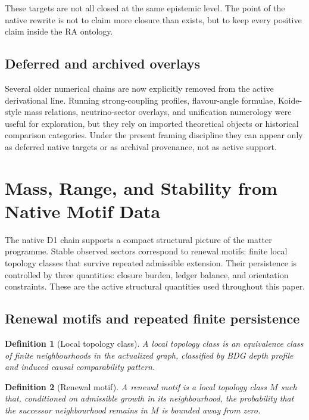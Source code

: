 \documentclass[11pt]{article}
\newtheorem{definition}{Definition}
\begin{document}
These targets are not all closed at the same epistemic level. The point of the native rewrite is not to claim more closure than exists, but to keep every positive claim inside the RA ontology.

\subsection{Deferred and archived overlays}

Several older numerical chains are now explicitly removed from the active derivational line. Running strong-coupling profiles, flavour-angle formulae, Koide-style mass relations, neutrino-sector overlays, and unification numerology were useful for exploration, but they rely on imported theoretical objects or historical comparison categories. Under the present framing discipline they can appear only as deferred native targets or as archival provenance, not as active support.

\section{Mass, Range, and Stability from Native Motif Data}
\label{sec:motifs}

The native D1 chain supports a compact structural picture of the matter programme. Stable observed sectors correspond to renewal motifs: finite local topology classes that survive repeated admissible extension. Their persistence is controlled by three quantities: closure burden, ledger balance, and orientation constraints. These are the active structural quantities used throughout this paper.

\subsection{Renewal motifs and repeated finite persistence}

\begin{definition}[Local topology class]
A local topology class is an equivalence class of finite neighbourhoods in the actualized graph, classified by BDG depth profile and induced causal comparability pattern.
\end{definition}

\begin{definition}[Renewal motif]
A renewal motif is a local topology class $M$ such that, conditioned on admissible growth in its neighbourhood, the probability that the successor neighbourhood remains in $M$ is bounded away from zero.
\end{definition}
\end{document}
